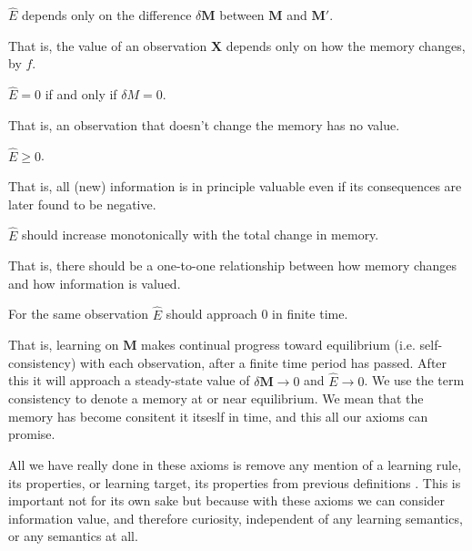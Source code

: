 \begin{axiom}
	$\hat E$ depends only on the difference $\delta \mathbf{M}$ between $\mathbf{M}$ and $\mathbf{M'}$.
\end{axiom}

That is, the value of an observation $\mathbf{X}$ depends only on how
the memory changes, by $f$. 

\begin{axiom}
	$\hat E = 0$ if and only if $\delta M = 0$. 
\end{axiom}

That is, an observation that doesn’t change the memory has no value.

\begin{axiom}
	$\hat E \ge 0$.
\end{axiom}

That is, all (new) information is in principle valuable even if its consequences are later found to be negative.

\begin{axiom}
	$\hat E$ should increase monotonically with the total change in memory. 
\end{axiom}

That is, there should be a one-to-one relationship between how memory changes and how information is valued.

\begin{axiom}
	For the same observation $\hat E$ should approach 0 in finite time.
\end{axiom}

That is, learning on $\mathbf{M}$ makes continual progress toward equilibrium (i.e. self-consistency) with each observation, after a finite time period has passed. After this it will approach a steady-state value of $\delta \mathbf{M} \rightarrow 0$ and $\hat E \rightarrow 0$. We use the term consistency to denote a memory at or near equilibrium. We mean that the memory has become consitent it itseslf in time, and this all our axioms can promise. 

All we have really done in these axioms is remove any mention of a learning rule, its properties, or learning target, its properties from previous definitions \cite{Itti2009,Jaegle2019,Schmidhuber1991,Inglis2001,Reddy2016,Pirolli2007}. This is important not for its own sake but because with these axioms we can consider information value, and therefore curiosity, independent of any learning semantics, or any semantics at all. 

